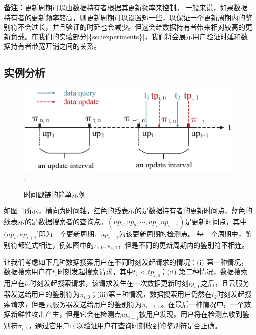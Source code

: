 \noindent \textbf{备注：}更新周期可以由数据持有者根据其更新频率来控制。 一般来说，如果数据持有者的更新频率较高，则更新周期可以设置短一些，以保证一个更新周期内的鉴别符不会过长，并且验证的时延也会减少。但这会给数据持有者带来相对较高的更新负载。在我们的实验部分\ref{{sec:experiments}}，我们将会展示用户验证时延和数据持有者带宽开销之间的关系。

\subsection{实例分析}

\begin{figure}[htb]
  \centering
  \includegraphics[width=6 in]{fig/timestamp}
  \DeclareGraphicsExtensions.
  \caption{时间戳链的简单示例}
  \label{fig:timestamp}
\end{figure}

如图~\ref{fig:timestamp}所示，横向为时间轴，红色的线表示的是数据持有者的更新时间点，蓝色的线表示的是数据搜索者的查询点。$(up_1,up_2,\cdots,up_i,up_{i+1})$是更新时间点，其中$(up_i,up_{i+1}]$即为一个更新周期，$up_{i+1}$为该更新周期的检测点。
每一个周期中，鉴别符都链式相连，例如图中的$\pi_{i, 0}, \pi_{i, 1}$，但是不同的更新周期内的鉴别符不相连。

让我们考虑如下几种数据搜索用户在不同时刻发起请求的情况：(i) 第一种情况，数据搜索用户在$t_1$时刻发起搜索请求，其中$t_1 < tp_{i, 0}$；(ii) 第二种情况，数据搜索用户在$t_2$时刻发起搜索请求，该请求发生在一次数据更新时刻$tp_{i, 0}$之后，且云服务器发送给用户的鉴别符为$\pi_{i, 0}$；(iii)第三种情况，数据搜索用户仍然在$t_2$时刻发起搜索请求，但是云服务器发送给用户的鉴别符为$\pi_{i-1, n}$。在最后一种情况中，一个数据新鲜性攻击产生，但是它会在检测点$up_{i+1}$被用户发现。用户将在检测点收到鉴别符$\pi_{i, 1}$，通过它用户可以验证用户在查询时刻收到的鉴别符是否正确。

